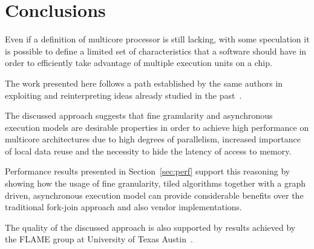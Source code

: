 \documentclass{article}
\begin{document}
\section{Conclusions}
\label{sec:conclusions}

Even if a definition of multicore processor is still lacking, with
some speculation it is possible to define a limited set of
characteristics that a software should have in order to efficiently
take advantage of multiple execution units on a chip. 

The work presented here follows a path established by the same authors
in~\cite{cell_chol,Kurzak:2006:ILA,para06,tiledqr} exploiting and
reinterpreting ideas already studied in the
past~\cite{1014508,670985,76287,essl01}.

The discussed approach suggests that fine granularity and asynchronous
execution models are desirable properties in order to achieve high
performance on multicore architectures due to high degrees of
parallelism, increased importance of local data reuse and the
necessity to hide the latency of access to memory.

Performance results presented in Section~\ref{sec:perf} support this
reasoning by showing how the usage of fine granularity, tiled
algorithms together with a graph driven, asynchronous execution model
can provide considerable benefits over the traditional fork-join
approach and also vendor implementations.

The quality of the discussed approach is also supported by results
achieved by the FLAME group at University of Texas
Austin~\cite{1248397,vdgqr}.


\end{document}
